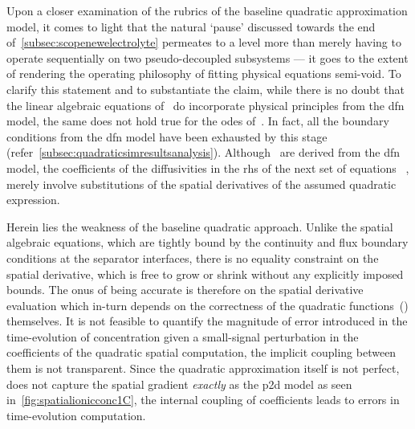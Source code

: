 Upon  a   closer  examination   of  the  rubrics   of  the   baseline  quadratic
approximation  model, it  comes  to  light that  the  natural `pause'  discussed
towards  the  end  of~\cref{subsec:scopenewelectrolyte}  permeates  to  a  level
more  than  merely  having  to  operate  sequentially  on  two  pseudo-decoupled
subsystems  --- it  goes to  the extent  of rendering  the operating  philosophy
of  fitting  physical  equations  semi-void.   To  clarify  this  statement  and
to  substantiate   the  claim,  while  there   is  no  doubt  that   the  linear
algebraic   equations  of~
do    incorporate    physical    principles   from    the    \gls{dfn}    model,
the     same     does     not      hold     true     for     the     \glspl{ode}
of~.   In  fact,
all   the   boundary   conditions   from   the   \gls{dfn}   model   have   been
exhausted   by  this   stage  (refer~\cref{subsec:quadraticsimresultsanalysis}).
Although~     are    derived
from     the      \gls{dfn}     model,      the     coefficients      of     the
diffusivities   in    the   \gls{rhs}   of    the   next   set    of   equations
\ie{}~,   merely
involve  substitutions  of the  spatial  derivatives  of the  assumed  quadratic
expression.

Herein lies the weakness of the  baseline quadratic approach. Unlike the spatial
algebraic equations, which are tightly bound by the continuity and flux boundary
conditions at the  separator interfaces, there is no equality  constraint on the
spatial  derivative, which  is free  to grow  or shrink  without any  explicitly
imposed  bounds.  The  onus  of  being accurate  is  therefore  on  the  spatial
derivative evaluation which in-turn depends  on the correctness of the quadratic
functions~()  themselves. It  is
not feasible to quantify the magnitude of error introduced in the time-evolution
of concentration  given a small-signal  perturbation in the coefficients  of the
quadratic spatial  computation,\ie{} the implicit  coupling between them  is not
transparent. Since the quadratic approximation itself is not perfect, \ie{} does
not capture the  spatial gradient \emph{exactly} as the \gls{p2d}  model as seen
in~\cref{fig:spatialionicconc1C}, the internal coupling of coefficients leads to
errors in time-evolution computation.

